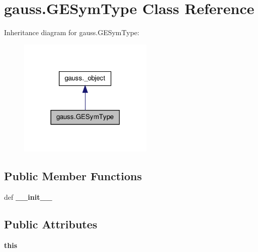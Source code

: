 \hypertarget{classgauss_1_1_g_e_sym_type}{\section{gauss.\-G\-E\-Sym\-Type Class Reference}
\label{classgauss_1_1_g_e_sym_type}
}


Inheritance diagram for gauss.\-G\-E\-Sym\-Type\-:\nopagebreak
\begin{figure}[H]
\begin{center}
\leavevmode
\includegraphics[width=182pt]{classgauss_1_1_g_e_sym_type__inherit__graph}
\end{center}
\end{figure}
\subsection*{Public Member Functions}
\begin{DoxyCompactItemize}
\item 
\hypertarget{classgauss_1_1_g_e_sym_type_a99033c4081eba0d49c0f1286f28eadb5}{def {\bfseries \-\_\-\-\_\-init\-\_\-\-\_\-}}\label{classgauss_1_1_g_e_sym_type_a99033c4081eba0d49c0f1286f28eadb5}

\end{DoxyCompactItemize}
\subsection*{Public Attributes}
\begin{DoxyCompactItemize}
\item 
\hypertarget{classgauss_1_1_g_e_sym_type_a304cae6c1c15a8032e84b639180ea7a7}{{\bfseries this}}\label{classgauss_1_1_g_e_sym_type_a304cae6c1c15a8032e84b639180ea7a7}

\end{DoxyCompactItemize}
